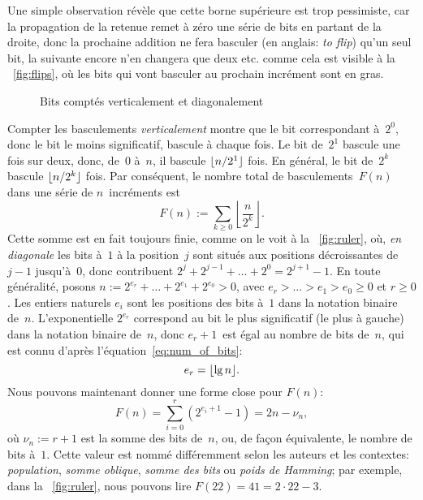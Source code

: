 Une simple observation révèle que cette borne supérieure est trop
pessimiste, car la propagation de la retenue remet à zéro une série de
bits en partant de la droite, donc la prochaine addition ne fera
basculer (en anglais: \emph{to flip}) qu'un seul bit, la suivante
encore n'en changera que deux etc. comme cela est visible à la
\fig~\vref{fig:flips}, où les bits qui vont basculer au prochain
incrément sont en gras.
\begin{figure}[t]
\centering
{}
\qquad
{}
\caption{Bits comptés verticalement et diagonalement}
\end{figure}
Compter les basculements \emph{verticalement} montre que le bit
correspondant à~\(2^0\), donc le bit le moins significatif, bascule à
chaque fois. Le bit de~\(2^1\) bascule une fois sur deux, donc,
de~\(0\) à~\(n\), il bascule \(\lfloor{n/2^1}\rfloor\) fois. En général, le
bit de~\(2^k\) bascule \(\lfloor{n/2^k}\rfloor\) fois. Par conséquent, le
nombre total de basculements~\(F(n)\) dans une série de
\(n\)~incréments est
\begin{equation}
F(n) := \sum_{k \geqslant 0}{\left\lfloor\frac{n}{2^k}\right\rfloor}.
\label{eq:F}
\end{equation}
Cette somme est en fait toujours finie, comme on le voit à la
\fig~\vref{fig:ruler}, où, \emph{en diagonale} les bits à~\(1\) à la
position~\(j\) sont situés aux positions décroissantes de~\(j-1\)
jusqu'à~\(0\), donc contribuent \(2^j + 2^{j-1} + \dots + 2^0 =
2^{j+1}-1\).  En toute généralité, posons \(n := 2^{e_r} + \dots +
2^{e_1} + 2^{e_0} > 0\), avec \(e_r > \dots > e_1 > e_0 \geqslant 0\)
et \(r \geqslant 0\). Les entiers naturels \(e_i\) sont les positions
des bits à~\(1\) dans la notation binaire de~\(n\). L'exponentielle
\(2^{e_r}\) correspond au bit le plus significatif (le plus à gauche)
dans la notation binaire de~\(n\), donc \(e_r+1\)~est égal au nombre
de bits de~\(n\), qui est connu d'après
l'équation~\eqref{eq:num_of_bits}:
\begin{equation}
e_r = \lfloor{\lg n}\rfloor.\label{eq:e_r}
\end{equation}
Nous pouvons maintenant donner une forme close pour \(F(n)\):
\begin{equation}
F(n) = \sum_{i=0}^{r}(2^{e_i+1} - 1) = 2n - \nu_n,
\label{eq:ruler_nu}
\end{equation}
où \(\nu_n := r + 1\) est la somme des bits de~\(n\), ou, de façon équivalente,
le nombre de bits à~\(1\). Cette valeur est nommé différemment selon
les auteurs et les contextes: \emph{population}, \emph{somme oblique},
\emph{somme des bits} ou \emph{poids de
  Hamming}; par exemple, dans la \fig~\vref{fig:ruler}, nous pouvons
lire \(F(22) = 41 = 2 \cdot 22 - 3\).

